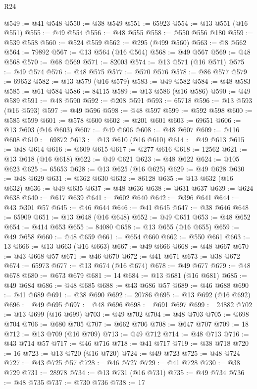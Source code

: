 \begin{lexlean}{R24}
\begin{coremodule}
@549 := @41 @548
@550 := @38 @549
@551 := 65923
@554 := @13 @551 (@16 @551)
@555 := @49 @554
@556 := @48 @555
@558 := @550 @556 @180
@559 := @539 @558
@560 := @524 @559
@562 := @295 (@499 @560)
@563 := @8 @562
@564 := 79892
@567 := @13 @564 (@16 @564)
@568 := @49 @567
@569 := @48 @568
@570 := @68 @569
@571 := 82003
@574 := @13 @571 (@16 @571)
@575 := @49 @574
@576 := @48 @575
@577 := @570 @576
@578 := @86 @577
@579 := 69652
@582 := @13 @579 (@16 @579)
@583 := @49 @582
@584 := @48 @583
@585 := @61 @584
@586 := 84115
@589 := @13 @586 (@16 @586)
@590 := @49 @589
@591 := @48 @590
@592 := @208 @591
@593 := 65718
@596 := @13 @593 (@16 @593)
@597 := @49 @596
@598 := @48 @597
@599 := @592 @598
@600 := @585 @599
@601 := @578 @600
@602 := @201 @601
@603 := 69651
@606 := @13 @603 (@16 @603)
@607 := @49 @606
@608 := @48 @607
@609 := @116 @608
@610 := 69872
@613 := @13 @610 (@16 @610)
@614 := @49 @613
@615 := @48 @614
@616 := @609 @615
@617 := @277 @616
@618 := 12562
@621 := @13 @618 (@16 @618)
@622 := @49 @621
@623 := @48 @622
@624 := @105 @623
@625 := 65653
@628 := @13 @625 (@16 @625)
@629 := @49 @628
@630 := @48 @629
@631 := @362 @630
@632 := 86128
@635 := @13 @632 (@16 @632)
@636 := @49 @635
@637 := @48 @636
@638 := @631 @637
@639 := @624 @638
@640 := @617 @639
@641 := @602 @640
@642 := @396 @641
@644 := @43 @301 @57
@645 := @46 @644
@646 := @41 @645
@647 := @38 @646
@648 := 65909
@651 := @13 @648 (@16 @648)
@652 := @49 @651
@653 := @48 @652
@654 := @414 @653
@655 := 84080
@658 := @13 @655 (@16 @655)
@659 := @49 @658
@660 := @48 @659
@661 := @654 @660
@662 := @550 @661
@663 := 13
@666 := @13 @663 (@16 @663)
@667 := @49 @666
@668 := @48 @667
@670 := @43 @668 @57
@671 := @46 @670
@672 := @41 @671
@673 := @38 @672
@674 := 65973
@677 := @13 @674 (@16 @674)
@678 := @49 @677
@679 := @48 @678
@680 := @673 @679
@681 := 14
@684 := @13 @681 (@16 @681)
@685 := @49 @684
@686 := @48 @685
@688 := @43 @686 @57
@689 := @46 @688
@690 := @41 @689
@691 := @38 @690
@692 := 20786
@695 := @13 @692 (@16 @692)
@696 := @49 @695
@697 := @48 @696
@698 := @691 @697
@699 := 24882
@702 := @13 @699 (@16 @699)
@703 := @49 @702
@704 := @48 @703
@705 := @698 @704
@706 := @680 @705
@707 := @662 @706
@708 := @647 @707
@709 := 18
@712 := @13 @709 (@16 @709)
@713 := @49 @712
@714 := @48 @713
@716 := @43 @714 @57
@717 := @46 @716
@718 := @41 @717
@719 := @38 @718
@720 := 16
@723 := @13 @720 (@16 @720)
@724 := @49 @723
@725 := @48 @724
@727 := @43 @725 @57
@728 := @46 @727
@729 := @41 @728
@730 := @38 @729
@731 := 28978
@734 := @13 @731 (@16 @731)
@735 := @49 @734
@736 := @48 @735
@737 := @730 @736
@738 := 17

\end{coremodule}
\end{lexlean}
